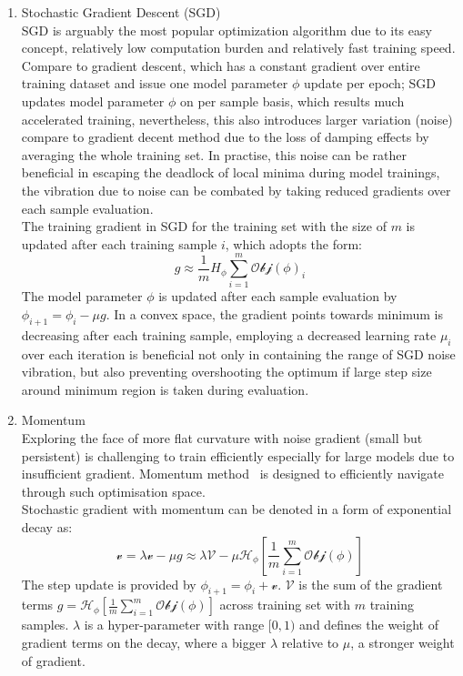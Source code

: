 \begin{enumerate}
    \item Stochastic Gradient Descent (SGD)\\
SGD is arguably the most popular optimization algorithm due to its easy concept, relatively low computation burden and relatively fast training speed. Compare to gradient descent, which has a constant gradient over entire training dataset and issue one  model parameter $\phi$ update per epoch; SGD updates model parameter $\phi$ on per sample basis, which results much accelerated training, nevertheless, this also introduces larger variation (noise) compare to gradient decent method due to the loss of damping effects by averaging the whole training set. In practise, this noise can be rather beneficial in escaping the deadlock of local minima during model trainings, the vibration due to noise can be combated by taking reduced gradients over each sample evaluation. \\
The training gradient in SGD for the training set with the size of $m$ is updated after each training sample $i$, which adopts the form: 
\begin{equation}
    g \approx \frac{1}{m}H_{\phi}\sum_{i=1}^m\mathcal{Obj}(\phi)_i
\end{equation}
The model parameter $\phi$ is updated after each sample evaluation by $\phi_{i+1} = \phi_i - \mu g$. In a convex space, the gradient points towards minimum is decreasing after each training sample, employing a decreased learning rate $\mu_i$ over each iteration is beneficial not only in containing the range of SGD noise vibration, but also preventing overshooting the optimum if large step size around minimum region is taken during evaluation. 
    \item Momentum \\
Exploring the face of more flat curvature with noise gradient (small but persistent) is challenging to train efficiently especially for large models due to insufficient gradient. Momentum method~\cite{POLYAK19641} is designed to efficiently navigate through such optimisation space. \\
Stochastic gradient with momentum can be denoted in a form of exponential decay as: 
\begin{equation}
    \mathcal{v} = \lambda \mathcal{v} - \mu g \approx \lambda \mathcal{V} - \mu \mathcal{H}_{\phi} [\frac{1}{m} \sum_{i=1}^m
    \mathcal{Obj}(\phi)]
\end{equation}
The step update is provided by $\phi_{i+1} = \phi_i + \mathcal{v}$. $\mathcal{V}$ is the sum of the gradient terms $g = \mathcal{H}_{\phi} [\frac{1}{m} \sum_{i=1}^m \mathcal{Obj}(\phi)]$ across training set with $m$ training samples. $\lambda$ is a hyper-parameter with range $[0,1)$ and defines the weight of  gradient terms on the decay, where a bigger $\lambda$ relative to $\mu$, a stronger weight of gradient. 
\end{enumerate}

